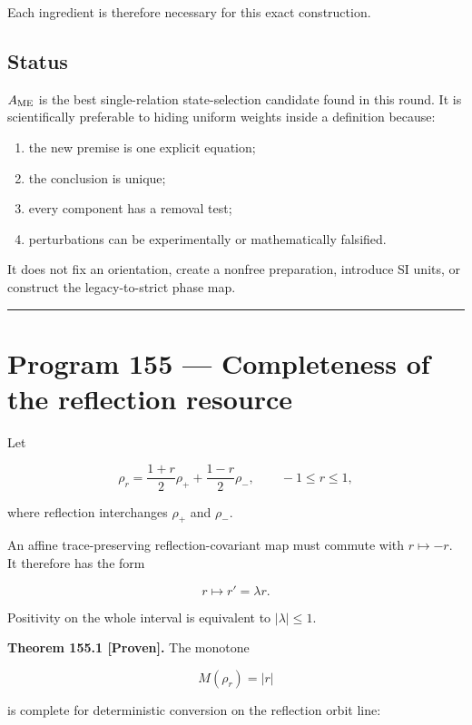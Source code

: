 \documentclass[11pt,a4paper,openany]{report}
\newcommand{\statusProven}{\textcolor{fingreen}{[Proven]}}
\begin{document}
Each ingredient is therefore necessary for this exact construction.

\section{Status}

\(A_{\rm ME}\) is the best single-relation state-selection candidate found in this round. It is scientifically preferable to hiding uniform weights inside a definition because:

\begin{enumerate}
\item 
the new premise is one explicit equation;

\item 
the conclusion is unique;

\item 
every component has a removal test;

\item 
perturbations can be experimentally or mathematically falsified.

\end{enumerate}

It does not fix an orientation, create a nonfree preparation, introduce SI units, or construct the legacy-to-strict phase map.

\par\medskip\hrule\medskip

\chapter{Program 155 --- Completeness of the reflection resource}

Let

\[
\rho_r
=
\frac{1+r}{2}\rho_+
+\frac{1-r}{2}\rho_-,
\qquad -1\le r\le1,
\]

where reflection interchanges \(\rho_+\) and \(\rho_-\).

An affine trace-preserving reflection-covariant map must commute with \(r\mapsto-r\). It therefore has the form

\[
r\longmapsto r'=\lambda r.
\]

Positivity on the whole interval is equivalent to \(|\lambda|\le1\).

\textbf{Theorem 155.1 \statusProven{}.} The monotone

\[
M(\rho_r)=|r|
\]

is complete for deterministic conversion on the reflection orbit line:
\end{document}
